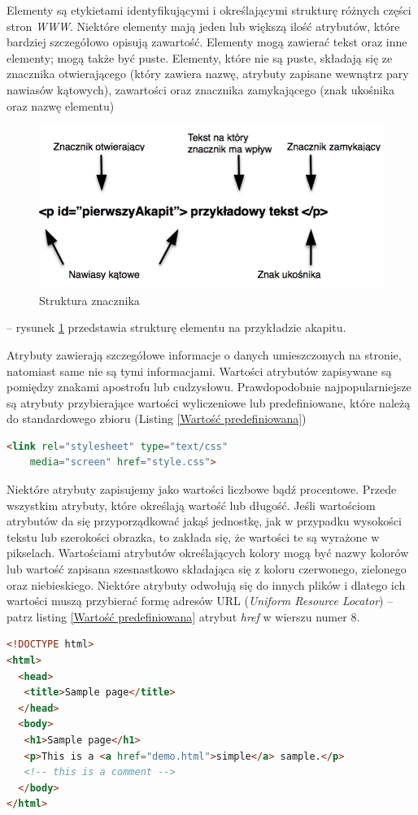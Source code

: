 \documentclass{iiuwb}
\begin{document}
Elementy są etykietami identyfikującymi i określającymi strukturę różnych części stron \textit{WWW}. Niektóre elementy mają jeden lub większą ilość atrybutów, które bardziej szczegółowo opisują zawartość. Elementy mogą zawierać tekst oraz inne elementy; mogą także być puste. Elementy, które nie są puste, składają się ze znacznika otwierającego (który zawiera nazwę, atrybuty zapisane wewnątrz pary nawiasów kątowych), zawartości oraz znacznika zamykającego (znak ukośnika oraz nazwę elementu) \cite{Castro:2008:H} 
\begin{figure}[!th]
\centering
\includegraphics[scale=.5]{image/StrukturaZnacznika2.png}
\caption{Struktura znacznika}
\label{fig:Struktura znacznika}
\end{figure}
-- rysunek \ref{fig:Struktura znacznika} przedstawia strukturę elementu na przykładzie akapitu.

Atrybuty zawierają szczegółowe informacje o danych umieszczonych na stronie, natomiast same nie są tymi informacjami. Wartości atrybutów zapisywane są pomiędzy znakami apostrofu lub cudzysłowu. Prawdopodobnie najpopularniejsze są atrybuty przybierające wartości wyliczeniowe lub predefiniowane, które należą do standardowego zbioru (Listing \ref{Wartość predefiniowana})
\begin{lstlisting}[language=HTML, label=Wartość predefiniowana, caption=Wartość predefiniowana]
<link rel="stylesheet" type="text/css" 
	media="screen" href="style.css">
\end{lstlisting}
Niektóre atrybuty zapisujemy jako wartości liczbowe bądź procentowe. Przede wszystkim atrybuty, które określają wartość lub długość. Jeśli wartościom atrybutów da  się przyporządkować jakąś jednostkę, jak w przypadku wysokości tekstu lub szerokości obrazka, to zakłada się, że wartości te są wyrażone w pikselach.
Wartościami atrybutów określających kolory mogą być nazwy kolorów lub wartość zapisana szesnastkowo składająca się z koloru czerwonego, zielonego oraz niebieskiego.
Niektóre atrybuty odwołują się do innych plików i dlatego ich wartości muszą przybierać formę adresów URL (\textit{Uniform Resource Locator}) -- patrz listing \ref{Wartość predefiniowana} atrybut \textit{href} w wierszu numer 8.
	\begin{lstlisting}[language=HTML, label=Przykladowy HTML,  caption=Przykładowa składnia dokumentu HTML]
<!DOCTYPE html>
<html>
  <head>
   <title>Sample page</title>
  </head>
  <body>
   <h1>Sample page</h1>
   <p>This is a <a href="demo.html">simple</a> sample.</p>
   <!-- this is a comment -->
  </body>
</html>
	\end{lstlisting}
	
\end{document}
